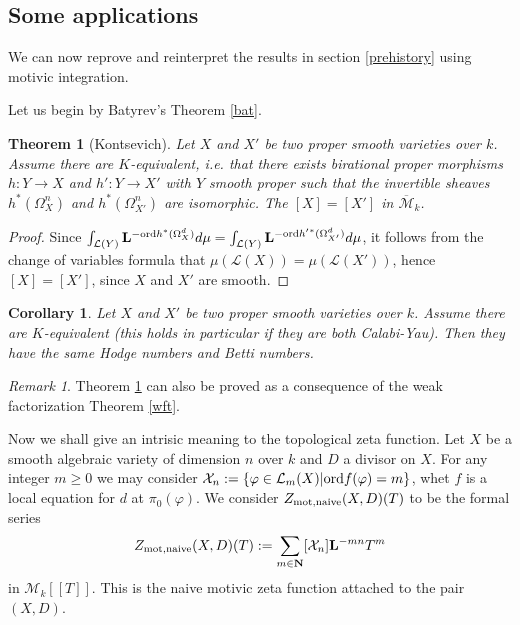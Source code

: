 \documentclass[english,12pt]{amsart}
\def\LL{{\mathbf L}}
\def\NN{{\mathbf N}}
\def\cL{{\mathcal L}}
\def\cM{{\mathcal M}}
\def\cX{{\mathcal X}}
\newtheorem{theorem}[subsubsection]{Theorem}
\newtheorem{cor}[subsubsection]{Corollary}
\theoremstyle{definition}
\theoremstyle{remark}
\newtheorem{remark}[subsubsection]{Remark}
\theoremstyle{plain}
\numberwithin{equation}{subsection}
\def\LL{{\mathbf L}}
\def\NN{{\mathbf N}}
\def\cL{{\mathcal L}}
\def\cM{{\mathcal M}}
\def\cX{{\mathcal X}}
\def\ord{{\rm ord}}
\begin{document}
\subsection{Some applications}We can  now reprove and reinterpret the results
in section \ref{prehistory} using motivic integration.

Let us begin by Batyrev's Theorem \ref{bat}.

\begin{theorem}[Kontsevich]\label{keq}Let $X$ and $X'$ be two proper smooth
varieties over $k$. Assume there are $K$-equivalent, i.e. that there 
exists
birational proper morphisms 
$h : Y \rightarrow X$ and $h' : Y \rightarrow X'$ with $Y$ 
smooth proper such that the invertible sheaves
$h^* (\Omega^n_X)$ and $h^* (\Omega^n_{X'})$ are isomorphic.
The $[X] = [X']$ in $\overline \cM_k$.
\end{theorem}


\begin{proof}Since $\int_{\cL (Y)} 
\LL^{- \ord h^* (\Omega^d_X)} d\mu
=
\int_{\cL (Y)} 
\LL^{- \ord h'{}^* (\Omega^d_{X'})} d\mu$, it follows from the change of variables 
formula that $\mu (\cL(X)) = \mu (\cL(X'))$, hence $[X] = [X']$, since $X$
and $X'$ are smooth.
\end{proof}


\begin{cor}Let $X$ and $X'$ be two proper smooth
varieties over $k$. Assume there are $K$-equivalent (this holds in particular if they are both
Calabi-Yau). Then they have the same Hodge numbers and Betti numbers.
\end{cor}


\begin{remark}Theorem \ref{keq} can also be proved as a consequence of the
weak factorization Theorem \ref{wft}.
\end{remark}








Now we shall give an intrisic meaning to the topological zeta function.
Let $X$ be a smooth algebraic variety of dimension $n$ over $k$
and $D$ a divisor on $X$. For any integer $m \geq 0$
we may consider $\cX_n := \{\varphi \in \cL_m (X) \vert \ord f (\varphi) =m\}$,
whet $f$ is a local equation for $d$ at $\pi_0 (\varphi)$.
We consider
$Z_{\rm mot, naive}(X, D)  (T)$ to be the formal series
$$
Z_{\rm mot, naive} (X, D)  (T) := \sum_{m \in \NN} [\cX_n] \LL^{-mn} T^m
$$
in $\cM_k [[T]]$. This is the naive motivic zeta function
attached to the pair $(X, D)$.
\end{document}

